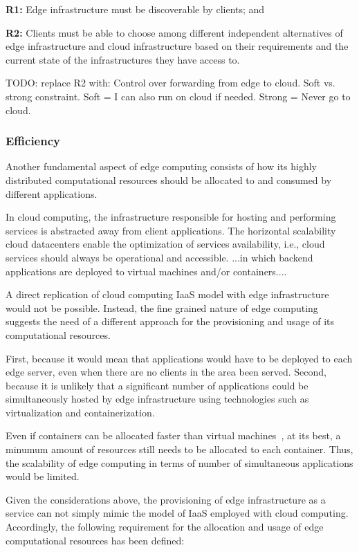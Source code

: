 \textbf{R1:} Edge infrastructure must be discoverable by clients; and 

\textbf{R2:} Clients must be able to choose among different independent alternatives of edge infrastructure and cloud infrastructure based on their requirements and the current state of the infrastructures they have access to.

TODO: replace R2 with: Control over forwarding from edge to cloud. Soft vs. strong constraint. Soft = I can also run on cloud if needed. Strong = Never go to cloud.

\subsubsection{Efficiency}

Another fundamental aspect of edge computing consists of how its highly distributed computational resources should be allocated to and consumed by different applications.

In cloud computing, the infrastructure responsible for hosting and performing services is abstracted away from client applications. The horizontal scalability cloud datacenters enable the optimization of services availability, i.e., cloud services should always be operational and accessible. ...in which backend applications are deployed to virtual machines and/or containers....

A direct replication of cloud computing IaaS model with edge infrastructure would not be possible. Instead, the fine grained nature of edge computing suggests the need of a different approach for the provisioning and usage of its computational resources. 

First, because it would mean that applications would have to be deployed to each edge server, even when there are no clients in the area been served. 
Second, because it is unlikely that a significant number of applications could be simultaneously hosted by edge infrastructure using technologies such as virtualization and containerization. 

Even if containers can be allocated faster than virtual machines~\cite{Giovanni}, at its best, a minumum amount of resources still needs to be allocated to each container. Thus, the scalability of edge computing in terms of number of simultaneous applications would be limited. 

Given the considerations above, the provisioning of edge infrastructure as a service can not simply mimic the model of IaaS employed with cloud computing. Accordingly, the following requirement for the allocation and usage of edge computational resources has been defined:
 
